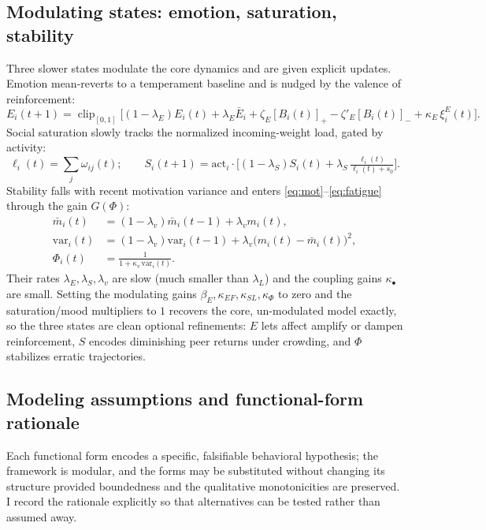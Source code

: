 \documentclass[11pt]{article}
\newcommand{\clip}{\operatorname{clip}_{[0,1]}}
\begin{document}
\subsection{Modulating states: emotion, saturation, stability}\label{sec:modulating}
Three slower states modulate the core dynamics and are given explicit updates. Emotion mean-reverts to a temperament baseline and is nudged by the valence of reinforcement:
\begin{equation}\tag{E}\label{eq:emotion}
E_i(t{+}1)=\clip\!\Big[(1-\lambda_E)E_i(t)+\lambda_E\bar E_i+\zeta_E[B_i(t)]_+-\zeta'_E[B_i(t)]_-+\kappa_E\,\xi^E_i(t)\Big].
\end{equation}
Social saturation slowly tracks the normalized incoming-weight load, gated by activity:
\begin{equation}\tag{S}\label{eq:saturation}
\ell_i(t)=\sum_j\omega_{ij}(t);\qquad S_i(t{+}1)=\mathrm{act}_i\cdot\Big[(1-\lambda_S)S_i(t)+\lambda_S\,\tfrac{\ell_i(t)}{\ell_i(t)+s_0}\Big].
\end{equation}
Stability falls with recent motivation variance and enters \eqref{eq:mot}--\eqref{eq:fatigue} through the gain $G(\Phi)$:
\begin{equation}\tag{$\Phi$}\label{eq:stability}
\begin{aligned}
\bar m_i(t)&=(1-\lambda_v)\bar m_i(t{-}1)+\lambda_v m_i(t),\\
\mathrm{var}_i(t)&=(1-\lambda_v)\mathrm{var}_i(t{-}1)+\lambda_v\big(m_i(t)-\bar m_i(t)\big)^2,\\
\Phi_i(t)&=\frac{1}{1+\kappa_v\,\mathrm{var}_i(t)}.
\end{aligned}
\end{equation}
Their rates $\lambda_E,\lambda_S,\lambda_v$ are slow (much smaller than $\lambda_L$) and the coupling gains $\kappa_\bullet$ are small. Setting the modulating gains $\beta_E,\kappa_{EF},\kappa_{SL},\kappa_\Phi$ to zero and the saturation/mood multipliers to $1$ recovers the core, un-modulated model exactly, so the three states are clean optional refinements: $E$ lets affect amplify or dampen reinforcement, $S$ encodes diminishing peer returns under crowding, and $\Phi$ stabilizes erratic trajectories.

\subsection{Modeling assumptions and functional-form rationale}\label{sec:assumptions}
Each functional form encodes a specific, falsifiable behavioral hypothesis; the framework is modular, and the forms may be substituted without changing its structure provided boundedness and the qualitative monotonicities are preserved. I record the rationale explicitly so that alternatives can be tested rather than assumed away.
\end{document}
